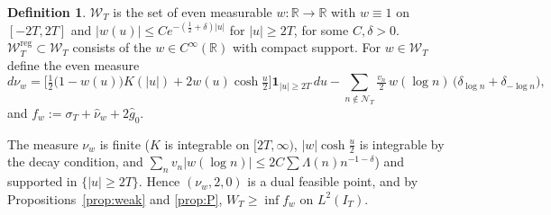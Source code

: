 \documentclass[10pt]{amsart}
\theoremstyle{definition}
\newtheorem{definition}[theorem]{Definition}
\theoremstyle{remark}
\newcommand{\R}{\mathbb R}
\newcommand{\IT}{I_T}
\newcommand{\sT}{\sigma_T}
\newcommand{\gh}[1]{\widehat g_{#1}}
\newcommand{\nuh}{\widehat\nu}
\newcommand{\Wcl}{\mathcal W_T}
\newcommand{\NT}{\mathcal N_T}
\begin{document}
\begin{definition}\label{def:W}
$\Wcl$ is the set of even measurable $w:\R\to\R$ with $w\equiv1$ on $[-2T,2T]$ and
$|w(u)|\le Ce^{-(\frac12+\delta)|u|}$ for $|u|\ge2T$, for some $C,\delta>0$. $\Wcl^{\mathrm{reg}}\subset\Wcl$
consists of the $w\in C^\infty(\R)$ with compact support. For $w\in\Wcl$ define the even measure
\begin{equation}\label{eq:nuw}
d\nu_w=\Big[\tfrac12\big(1-w(u)\big)K(|u|)+2w(u)\cosh\tfrac u2\Big]\mathbf 1_{|u|\ge2T}\,du
-\sum_{n\notin\NT}\tfrac{v_n}2\,w(\log n)\,\big(\delta_{\log n}+\delta_{-\log n}\big),
\end{equation}
and $f_w:=\sT+\nuh_w+2\gh0$.
\end{definition}
The measure $\nu_w$ is finite ($K$ is integrable on $[2T,\infty)$, $|w|\cosh\frac u2$ is
integrable by the decay condition, and $\sum_nv_n|w(\log n)|\le2C\sum\Lambda(n)n^{-1-\delta}$) and
supported in $\{|u|\ge2T\}$. Hence $(\nu_w,2,0)$ is a dual feasible point, and by
Propositions~\ref{prop:weak} and \ref{prop:P}, $W_T\ge\inf f_w$ on $L^2(\IT)$.
\end{document}
